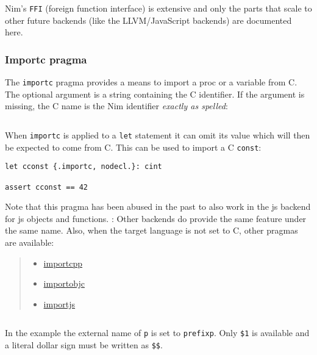 Nim's \texttt{FFI} (foreign function interface) is extensive and only
the parts that scale to other future backends (like the LLVM/JavaScript
backends) are documented here.

\hypertarget{importc-pragma}{%
\subsubsection{Importc pragma}\label{importc-pragma}}

The \texttt{importc} pragma provides a means to import a proc or a
variable from C. The optional argument is a string containing the C
identifier. If the argument is missing, the C name is the Nim identifier
\emph{exactly as spelled}:

\begin{verbatim}
\end{verbatim}

When \texttt{importc} is applied to a \texttt{let} statement it can omit
its value which will then be expected to come from C. This can be used
to import a C \texttt{const}:

\begin{verbatim}
let cconst {.importc, nodecl.}: cint

assert cconst == 42
\end{verbatim}

Note that this pragma has been abused in the past to also work in the js
backend for js objects and functions. : Other backends do provide the
same feature under the same name. Also, when the target language is not
set to C, other pragmas are available:

\begin{quote}
\begin{itemize}
\tightlist
\item
  \href{manual.html\#implementation-specific-pragmas-importcpp-pragma}{importcpp}
\item
  \href{manual.html\#implementation-specific-pragmas-importobjc-pragma}{importobjc}
\item
  \href{manual.html\#implementation-specific-pragmas-importjs-pragma}{importjs}
\end{itemize}
\end{quote}

\begin{verbatim}
\end{verbatim}

In the example the external name of \texttt{p} is set to
\texttt{prefixp}. Only \texttt{\$1} is available and a literal dollar
sign must be written as \texttt{\$\$}.

